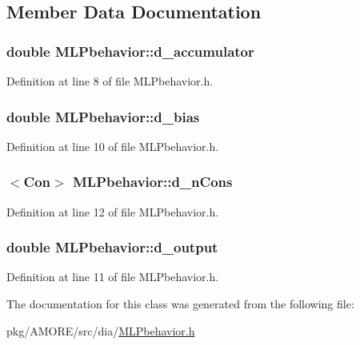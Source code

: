 \subsection{Member Data Documentation}
\hypertarget{class_m_l_pbehavior_a5e3dcaba201554283d27d58c6aa3ea82}{
\subsubsection[{d\_\-accumulator}]{\setlength{\rightskip}{0pt plus 5cm}double {\bf MLPbehavior::d\_\-accumulator}}}
\label{class_m_l_pbehavior_a5e3dcaba201554283d27d58c6aa3ea82}


Definition at line 8 of file MLPbehavior.h.

\hypertarget{class_m_l_pbehavior_a6206785c5c3f838a0538f9f77fa7a25a}{
\subsubsection[{d\_\-bias}]{\setlength{\rightskip}{0pt plus 5cm}double {\bf MLPbehavior::d\_\-bias}}}
\label{class_m_l_pbehavior_a6206785c5c3f838a0538f9f77fa7a25a}


Definition at line 10 of file MLPbehavior.h.

\hypertarget{class_m_l_pbehavior_aee18277595dce9c3fa640d267fb919e0}{
\subsubsection[{d\_\-nCons}]{$<${\bf Con}$>$ {\bf MLPbehavior::d\_\-nCons}}}
\label{class_m_l_pbehavior_aee18277595dce9c3fa640d267fb919e0}


Definition at line 12 of file MLPbehavior.h.

\hypertarget{class_m_l_pbehavior_a1a2045f66e72cd110227735ac0930900}{
\subsubsection[{d\_\-output}]{\setlength{\rightskip}{0pt plus 5cm}double {\bf MLPbehavior::d\_\-output}}}
\label{class_m_l_pbehavior_a1a2045f66e72cd110227735ac0930900}


Definition at line 11 of file MLPbehavior.h.



The documentation for this class was generated from the following file:\begin{DoxyCompactItemize}
\item 
pkg/AMORE/src/dia/\hyperlink{_m_l_pbehavior_8h}{MLPbehavior.h}\end{DoxyCompactItemize}
